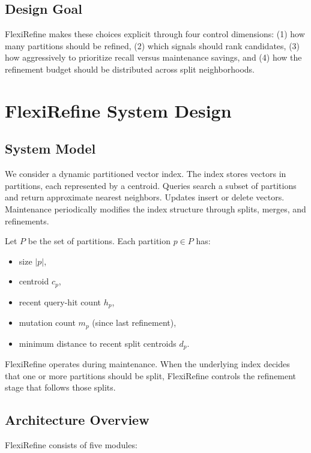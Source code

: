 \documentclass[sigconf, nonacm]{acmart}
\newcommand{\system}{FlexiRefine\xspace}
\begin{document}
\subsection{Design Goal}
\system makes these choices explicit through four control dimensions:
(1) how many partitions should be refined,
(2) which signals should rank candidates,
(3) how aggressively to prioritize recall versus maintenance savings,
and (4) how the refinement budget should be distributed across split
neighborhoods.

\section{\system System Design}
\label{sec:system}

\subsection{System Model}

We consider a dynamic partitioned vector index. The index stores vectors
in partitions, each represented by a centroid. Queries search a subset
of partitions and return approximate nearest neighbors. Updates insert
or delete vectors. Maintenance periodically modifies the index structure
through splits, merges, and refinements.

Let $P$ be the set of partitions. Each partition $p \in P$ has:
\begin{itemize}[leftmargin=*]
  \item size $|p|$,
  \item centroid $c_p$,
  \item recent query-hit count $h_p$,
  \item mutation count $m_p$ (since last refinement),
  \item minimum distance to recent split centroids $d_p$.
\end{itemize}

\system operates during maintenance. When the underlying index decides
that one or more partitions should be split, \system controls the
refinement stage that follows those splits.

\subsection{Architecture Overview}

\system consists of five modules:
\end{document}
